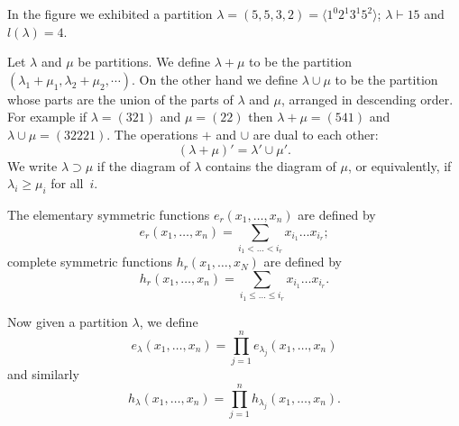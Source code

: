 \documentclass[11pt]{amsart}
\begin{document}
In the figure we exhibited a partition $\lambda = (5, 5, 3, 2)
=\langle 1^0 2^1 3^1 5^2 \rangle$; $\lambda \vdash 15$ and
$l(\lambda)=4$.


Let $\lambda$ and $\mu$ be partitions. We define $\lambda + \mu$
to be the partition $( \lambda_1 + \mu_1, \lambda_2 + \mu_2,
\cdots )$. On the other hand we define $\lambda \cup \mu$ to be
the partition whose parts are the union of the parts of $\lambda$
and $\mu$, arranged in descending order. For example if $\lambda =
( 321 )$ and $\mu = ( 22 )$ then $\lambda + \mu = ( 541 )$ and
$\lambda \cup \mu = ( 32221 )$. The operations $+$ and $\cup$ are
dual to each other:
\[ ( \lambda + \mu )' = \lambda' \cup \text{} \mu' . \]
We write $\lambda \supset \mu$ if the diagram of $\lambda$
contains the diagram of $\mu$, or equivalently, if $\lambda_i
\geqslant \mu_i$ for all~$i$.


The elementary symmetric functions $e_r(x_1, \dots, x_n)$ are
defined by \begin{equation} \label{e:elsim1} e_r(x_1, \dots, x_n)
=\sum_{i_1 < \dots < i_r}x_{i_1} \dots x_{i_r}; \end{equation}
complete symmetric functions $h_r(x_1, \dots, x_N)$ are defined by
\begin{equation} \label{e:comsim1} h_r(x_1, \dots, x_n) =\sum_{i_1
\leqslant \dots \leqslant i_r}x_{i_1} \dots x_{i_r}.
\end{equation}

Now given a partition $\lambda$,  we define
\begin{equation} \label{e:elsim2} e_{\lambda}(x_1, \dots , x_n)
=\prod_{j=1}^{n} e_{\lambda_j}(x_1, \dots, x_n)\end{equation} and
similarly
\begin{equation} \label{e:comsim2} h_{\lambda}(x_1, \dots , x_n)
=\prod_{j=1}^{n} h_{\lambda_j}(x_1, \dots, x_n).\end{equation}
\end{document}
